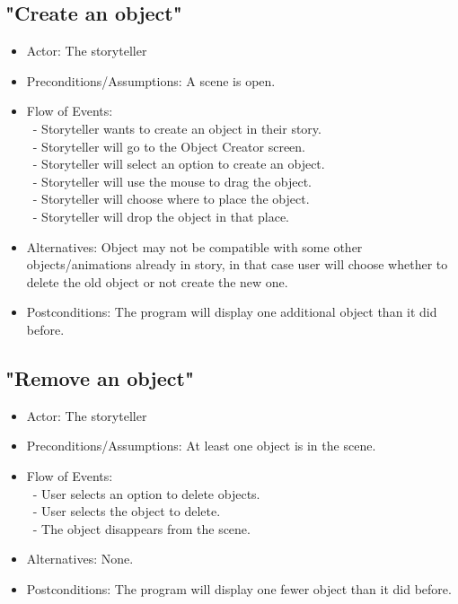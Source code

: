 \documentclass[12pt]{article}
\begin{document}
	\subsection{"Create an object"}
\begin{itemize}
	\item Actor: The storyteller
	\item Preconditions/Assumptions: A scene is open. 
	\item Flow of Events: \\
	 	\ - Storyteller wants to create an object in their story. \\
	 	\ - Storyteller will go to the Object Creator screen. \\
		\ - Storyteller will select an option to create an object. \\
		\ - Storyteller will use the mouse to drag the object. \\
		\ - Storyteller will choose where to place the object. \\
		\ - Storyteller will drop the object in that place.
	\item Alternatives: Object may not be compatible with some other objects/animations already in story, in that case user will choose whether to delete the old object or not create the new one.
	\item Postconditions: The program will display one additional object than it did before.
\end{itemize}


	\subsection{"Remove an object"}
\begin{itemize}
	\item Actor: The storyteller
	\item Preconditions/Assumptions: At least one object is in the scene.
	\item Flow of Events: \\
	\	- User selects an option to delete objects. \\
	\	- User selects the object to delete. \\
	\	- The object disappears  from the scene.
	\item Alternatives: None.
	\item Postconditions: The program will display one fewer object than it did before.
\end{itemize}
\end{document}
